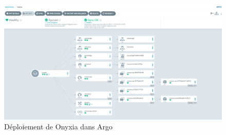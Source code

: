 \documentclass[11pt,fleqn]{book} %
\begin{document}
\begin{figure}[H]
\renewcommand{\figurename}{Capture d'écran}
\hspace{-2.5cm}
\includegraphics[scale=0.5,trim={0 0 5cm 0},clip]{Pictures/CI-CD/Onyxia-argo.PNG}
\captionsetup{margin=1.5cm,format=hang,justification=justified}
\caption[]{Déploiement de Onyxia dans Argo \newline}
\label{onyxia-argo}
\end{figure}
 
\end{document}
